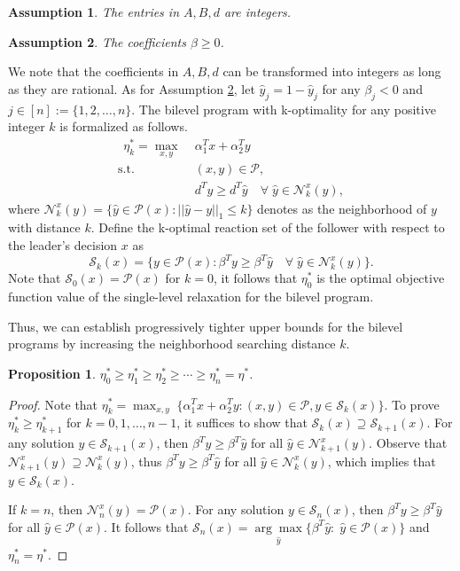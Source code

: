 \documentclass[11pt]{article}
\newtheorem{proposition}{Proposition}
\newtheorem{assumption}{Assumption}
\newcommand{\N}{\mathcal{N}}
\newcommand{\Pp}{\mathcal{P}}
\newcommand{\Ss}{\mathcal{S}}
\begin{document}
\begin{assumption}
	The entries in $A, B, d$ are integers.
\end{assumption}
\begin{assumption}\label{assm:d_pos}
	The coefficients $\beta \geq 0$.
\end{assumption}
We note that the coefficients in $A, B, d$ can be transformed into integers as long as they are rational. As for Assumption \ref{assm:d_pos}, let $\hat{y}_j = 1-\hat{y}_j$ for any $\beta_j < 0$ and $j\in [n]:=\{1,2,\ldots, n\}$. The bilevel program with k-optimality for any positive integer $k$ is formalized as follows.
\begin{align*}
[\text{BP}_k]~~\eta_k^* = \max_{x, y}\; & \alpha_1^Tx + \alpha_2^Ty \\
\text{s.t.~~} &  (x, y)\in \Pp, \\
& d^T y \geq d^T \hat{y} \quad \forall\; \hat{y} \in \N^x_k(y),
\end{align*}
where $\N^x_k(y) = \{\hat{y} \in \Pp(x): ||\hat{y} - y||_1 \leq k \}$ denotes as the neighborhood of $y$ with distance $k$. Define the k-optimal reaction set of the follower with respect to the leader's decision $x$ as  
$$\Ss_k(x) = \{y\in \Pp(x): \beta^Ty \geq \beta^T\hat{y} \quad \forall\; \hat{y} \in \N^x_k(y)\}.$$ 
Note that $\Ss_0(x) = \Pp(x)$ for $k=0$, it follows that $\eta_0^*$ is the optimal objective function value of the single-level relaxation for the bilevel program.


Thus, we can establish progressively tighter upper bounds for the bilevel programs by increasing the neighborhood searching distance $k$.

\begin{proposition} \label{thm:hierachy_upper_bounds}
	$\eta_0^* \geq \eta_1^* \geq \eta_2^* \geq \cdots \geq \eta_n^* = \eta^*$.  
\end{proposition}
\begin{proof}
	Note that $\eta_k^* = \max_{x, y}\; \{\alpha_1^Tx + \alpha_2^Ty:  (x, y) \in \Pp, y\in \Ss_k(x)\}$. To prove $\eta_k^* \geq \eta_{k+1}^*$ for $k=0, 1, \ldots, n-1$, it suffices to show that $\Ss_{k}(x) \supseteq \Ss_{k+1}(x)$. For any solution $y \in \Ss_{k+1}(x)$, then $\beta^T y \geq \beta^T \hat{y}$ for all $\hat{y} \in \N^x_{k+1}(y)$. Observe that $\N^x_{k+1}(y) \supseteq \N^x_{k}(y)$, thus $\beta^T y \geq \beta^T \hat{y}$ for all $\hat{y} \in \N^x_{k}(y)$, which implies that $y\in \Ss_k(x)$.
	
	If $k = n$, then $\N^x_n(y) = \Pp(x)$. For any solution $y\in \Ss_n(x)$, then $\beta^T y \geq \beta^T \hat{y}$ for all $\hat{y} \in \Pp(x)$. It follows that $\Ss_n(x) = \underset{\hat{y}}{\arg\max}\{\beta^T\hat{y}:\; \hat{y} \in \Pp(x)\}$ and $\eta_n^* = \eta^*$.
\end{proof}
\end{document}

